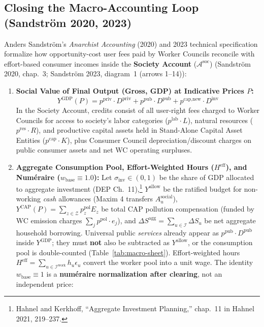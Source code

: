 \documentclass[10pt,twoside,openany]{book}
\theoremstyle{dpepstyle}
\begin{document}
\subsection{Closing the Macro-Accounting Loop (Sandstr\"om 2020, 2023)}
Anders Sandstr\"om's \emph{Anarchist Accounting} (2020) and 2023 technical specification formalize how opportunity-cost user fees paid by Worker Councils reconcile with effort-based consumer incomes inside the \textbf{Society Account} ($\mathcal{A}^{\text{soc}}$) (Sandstr\"om 2020, chap.~3; Sandstr\"om 2023, diagram~1 (arrows 1--14)):

\begin{enumerate}[leftmargin=1.8em,itemsep=3pt]
  \item \textbf{Social Value of Final Output (Gross, GDP) at Indicative Prices $P$:}
  \begin{equation}
    Y^{\text{GDP}}(P) = p^{\text{priv}} \cdot D^{\text{priv}} + p^{\text{pub}} \cdot D^{\text{pub}} + p^{\text{cap,new}} \cdot D^{\text{inv}}
  \end{equation}
  In the Society Account, credits consist of all user-right fees charged to Worker Councils for access to society's labor categories ($p^{\text{lab}} \cdot L$), natural resources ($p^{\text{res}} \cdot R$), and productive capital assets held in Stand-Alone Capital Asset Entities ($p^{\text{cap}} \cdot K$), plus Consumer Council depreciation/discount charges on public consumer assets and net WC operating surpluses.
  \item \textbf{Aggregate Consumption Pool, Effort-Weighted Hours ($H^{\text{eff}}$), and Num\'eraire ($w_{\text{base}} \equiv 1.0$):}
  Let $\sigma_{\text{inv}} \in (0, 1)$ be the share of GDP allocated to aggregate investment (DEP Ch.~11),\footnote{Hahnel and Kerkhoff, ``Aggregate Investment Planning,'' chap.~11 in Hahnel 2021, 219--237.} $Y^{\text{allow}}$ be the ratified budget for non-working \emph{cash} allowances (Maxim 4 transfers $A_u^{\text{social}}$), $Y^{\text{CAP}}(P) = \sum_{z \in \mathcal{Z}} p_z^{\text{pol}} E_z$ be total CAP pollution compensation (funded by WC emission charges $\sum_j p^{\text{pol}} \cdot e_j$), and $\Delta S^{\text{agg}} = \sum_{u \in \mathcal{I}} \Delta S_u$ be net aggregate household borrowing. Universal public \emph{services} already appear as $p^{\text{pub}}\cdot D^{\text{pub}}$ inside $Y^{\text{GDP}}$; they must \textbf{not} also be subtracted as $Y^{\text{allow}}$, or the consumption pool is double-counted (Table~\ref{tab:macro-sheet}). Effort-weighted hours $H^{\text{eff}} = \sum_{u \in \mathcal{I}^{\text{work}}} h_u \epsilon_u$ convert the worker pool into a unit wage. The identity $w_{\text{base}}\equiv 1$ is a \textbf{num\'eraire normalization after clearing}, not an independent price:

\end{enumerate}
\end{document}
